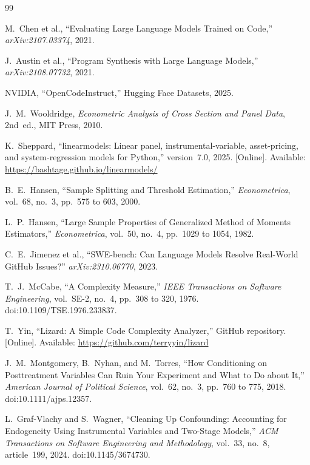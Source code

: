 \documentclass{article}
\begin{document}


\begin{thebibliography}{99}

M.~Chen et al., ``Evaluating Large Language Models Trained on Code,'' \emph{arXiv:2107.03374}, 2021.

J.~Austin et al., ``Program Synthesis with Large Language Models,'' \emph{arXiv:2108.07732}, 2021.

NVIDIA, ``OpenCodeInstruct,'' Hugging Face Datasets, 2025.

J.~M.~Wooldridge, \emph{Econometric Analysis of Cross Section and Panel Data}, 2nd~ed., MIT Press, 2010.

K.~Sheppard, ``linearmodels: Linear panel, instrumental-variable, asset-pricing, and system-regression models for Python,'' version~7.0, 2025. [Online]. Available: \url{https://bashtage.github.io/linearmodels/}

B.~E.~Hansen, ``Sample Splitting and Threshold Estimation,'' \emph{Econometrica}, vol.~68, no.~3, pp.~575 to 603, 2000.

L.~P.~Hansen, ``Large Sample Properties of Generalized Method of Moments Estimators,'' \emph{Econometrica}, vol.~50, no.~4, pp.~1029 to 1054, 1982.

C.~E.~Jimenez et al., ``SWE-bench: Can Language Models Resolve Real-World GitHub Issues?'' \emph{arXiv:2310.06770}, 2023.

T.~J.~McCabe, ``A Complexity Measure,'' \emph{IEEE Transactions on Software Engineering}, vol.~SE-2, no.~4, pp.~308 to 320, 1976. doi:10.1109/TSE.1976.233837.

T.~Yin, ``Lizard: A Simple Code Complexity Analyzer,'' GitHub repository. [Online]. Available: \url{https://github.com/terryyin/lizard}

J.~M.~Montgomery, B.~Nyhan, and M.~Torres, ``How Conditioning on Posttreatment Variables Can Ruin Your Experiment and What to Do about It,'' \emph{American Journal of Political Science}, vol.~62, no.~3, pp.~760 to 775, 2018. doi:10.1111/ajps.12357.

L.~Graf-Vlachy and S.~Wagner, ``Cleaning Up Confounding: Accounting for Endogeneity Using Instrumental Variables and Two-Stage Models,'' \emph{ACM Transactions on Software Engineering and Methodology}, vol.~33, no.~8, article~199, 2024. doi:10.1145/3674730.


\end{thebibliography}
\end{document}
